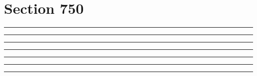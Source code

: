 \documentclass[11pt,a4paper]{article}
\begin{document}
\section{Section 750}
\begin{swarmwrap}%
  \begin{minipage}[t]{4cm}
    \centering
    \textcolor{red!20}{\rule{\linewidth}{5cm}}
  \end{minipage}%
\end{swarmwrap}%
\swarmwrapnext\lipsum[1]
\begin{swarmwrap}%
  \begin{minipage}[t]{5cm}
    \centering
    \textcolor{red!20}{\rule{\linewidth}{6cm}}
  \end{minipage}%
\end{swarmwrap}%
\swarmwrapnext\lipsum[1]\lipsum[2]
\begin{swarmwrap}%
  \begin{minipage}[t]{2cm}
    \centering
    \textcolor{red!20}{\rule{\linewidth}{7cm}}
  \end{minipage}%
\end{swarmwrap}%
\swarmwrapnext\lipsum[1]\lipsum[2]\lipsum[3]
\begin{swarmwrap}%
  \begin{minipage}[t]{3cm}
    \centering
    \textcolor{red!20}{\rule{\linewidth}{8cm}}
  \end{minipage}%
\end{swarmwrap}%
\swarmwrapnext\lipsum[1]\lipsum[2]\lipsum[3]\lipsum[4]
\begin{swarmwrap}%
  \begin{minipage}[t]{4cm}
    \centering
    \textcolor{red!20}{\rule{\linewidth}{9cm}}
  \end{minipage}%
\end{swarmwrap}%
\swarmwrapnext\lipsum[1]\lipsum[2]\lipsum[3]\lipsum[4]\lipsum[5]
\begin{swarmwrap}%
  \begin{minipage}[t]{5cm}
    \centering
    \textcolor{red!20}{\rule{\linewidth}{10cm}}
  \end{minipage}%
\end{swarmwrap}%
\swarmwrapnext\lipsum[1]\lipsum[2]\lipsum[3]\lipsum[4]\lipsum[5]\lipsum[6]
\begin{swarmwrap}%
  \begin{minipage}[t]{2cm}
    \centering
    \textcolor{red!20}{\rule{\linewidth}{2cm}}
  \end{minipage}%
\end{swarmwrap}%
\end{document}
